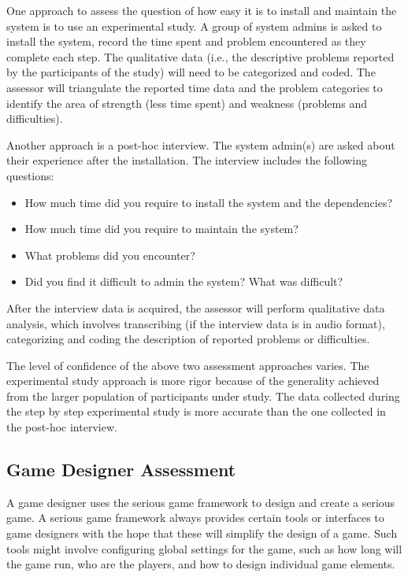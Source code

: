 One approach to assess the question of how easy it is to install and maintain the system is to use
an experimental study. A group of system admins is asked to install the system, record the time
spent and problem encountered as they complete each step. The qualitative data (i.e., the
descriptive problems reported by the participants of the study) will need to be categorized and
coded. The assessor will triangulate the reported time data and the problem categories to identify
the area of strength (less time spent) and weakness (problems and difficulties).

Another approach is a post-hoc interview. The system admin(s) are asked about their experience
after the installation. The interview includes the following questions:

\begin{itemize}
\item How much time did you require to install the system and the dependencies?
\item How much time did you require to maintain the system?
\item What problems did you encounter?
\item Did you find it difficult to admin the system? What was difficult?
\end{itemize}

After the interview data is acquired, the assessor will perform qualitative data
analysis, which involves transcribing (if the interview data is in audio format),
categorizing and coding the description of reported problems or difficulties.

The level of confidence of the above two assessment approaches varies. The experimental study
approach is more rigor because of the generality achieved from the larger population of
participants under study. The data collected during the step by step experimental study is more
accurate than the one collected in the post-hoc interview.

\subsection{Game Designer Assessment}

A game designer uses the serious game framework to design and create a serious game.
A serious game framework always provides certain tools or interfaces to game designers
with the hope that these will simplify the design of a game. Such tools might involve
configuring global settings for the game, such as how long will the game run, who are the
players, and how to design individual game elements.

